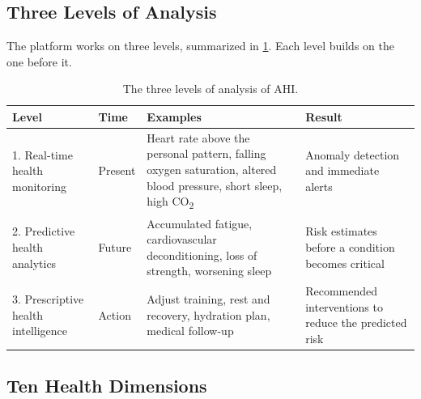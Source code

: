 \subsection{Three Levels of Analysis}
\label{subsec:three-levels}

The platform works on three levels, summarized in \ref{tab:levels}. Each level builds on the one before it.

\begin{table}[htbp]
\centering
\vspace{0.8em}
\caption{The three levels of analysis of AHI.}
\label{tab:levels}
\small
\begin{tabular}{p{3.6cm}p{1.6cm}p{4.6cm}p{4.2cm}}
\hline
\textbf{Level} & \textbf{Time} & \textbf{Examples} & \textbf{Result} \\
\hline
1. Real-time health monitoring & Present & Heart rate above the personal pattern, falling oxygen saturation, altered blood pressure, short sleep, high CO\textsubscript{2} & Anomaly detection and immediate alerts \\
2. Predictive health analytics & Future & Accumulated fatigue, cardiovascular deconditioning, loss of strength, worsening sleep & Risk estimates before a condition becomes critical \\
3. Prescriptive health intelligence & Action & Adjust training, rest and recovery, hydration plan, medical follow-up & Recommended interventions to reduce the predicted risk \\
\hline
\end{tabular}
\vspace{1.2em}
\end{table}

\subsection{Ten Health Dimensions}
\label{subsec:health-dimensions}

